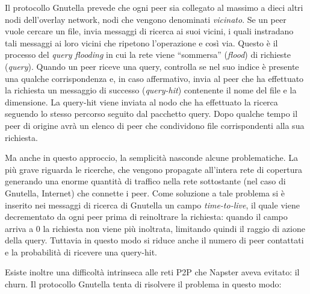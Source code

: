 Il protocollo Gnutella prevede che ogni peer sia collegato al massimo a dieci altri nodi dell'overlay network, nodi che vengono denominati \emph{vicinato}. Se un peer vuole cercare un file, invia messaggi di ricerca ai suoi vicini, i quali instradano tali messaggi ai loro vicini che ripetono l'operazione e così via. Questo è il processo del \emph{query flooding} in cui la rete viene ``sommersa'' (\emph{flood}) di richieste (\emph{query}). Quando un peer riceve una query, controlla se nel suo indice è presente una qualche corrispondenza e, in caso affermativo, invia al peer che ha effettuato la richiesta un messaggio di successo (\emph{query-hit}) contenente il nome del file e la dimensione. La query-hit viene inviata al nodo che ha effettuato la ricerca seguendo lo stesso percorso seguito dal pacchetto query. Dopo qualche tempo il peer di origine avrà un elenco di peer che condividono file corrispondenti alla sua richiesta.

Ma anche in questo approccio, la semplicità nasconde alcune problematiche. La più grave riguarda le ricerche, che vengono propagate all'intera rete di copertura generando una enorme quantità di traffico nella rete sottostante (nel caso di Gnutella, Internet) che connette i peer. Come soluzione a tale problema si è inserito nei messaggi di ricerca di Gnutella un campo \emph{time-to-live}, il quale viene decrementato da ogni peer prima di reinoltrare la richiesta: quando il campo arriva a 0 la richiesta non viene più inoltrata, limitando quindi il raggio di azione della query. Tuttavia in questo modo si riduce anche il numero di peer contattati e la probabilità di ricevere una query-hit.

Esiste inoltre una difficoltà intrinseca alle reti P2P che Napster aveva evitato: il churn. Il protocollo Gnutella tenta di risolvere il problema in questo modo:

